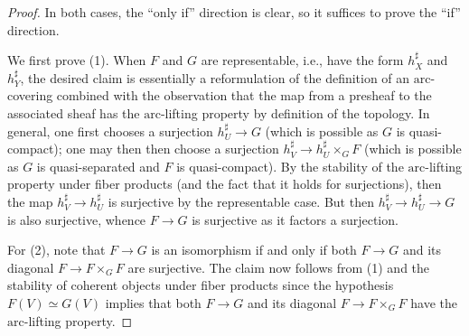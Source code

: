 \documentclass[reqno]{amsart}
\newcommand{\arc}{\mathrm{arc}}
\theoremstyle{definition}
\begin{document}
\begin{proof} In both cases, the ``only if'' direction is clear, so it suffices to prove the ``if'' direction.

We first prove (1). When $F$ and $G$ are representable, i.e., have the form
$h_X^\sharp$ and $h_Y^\sharp$, the desired claim is essentially a reformulation
of the definition of an $\arc$-covering combined with the observation that the
map from a presheaf to the associated sheaf has the $\arc$-lifting property by
definition of the topology. In general, one first chooses a surjection
$h_U^\sharp \to G$ (which is possible as $G$ is quasi-compact); one may then then
choose a surjection $h_V^\sharp \to h_U^\sharp \times_G F$ (which is possible as
$G$ is quasi-separated and $F$ is quasi-compact). By the stability of the
$\arc$-lifting property under fiber products (and the fact that it holds 
for surjections), then the map $h_V^\sharp \to h_U^\sharp$ is surjective by the representable case. But then $h_V^\sharp \to h_U^\sharp \to G$ is also surjective, whence $F \to G$ is surjective as it factors a surjection.

For (2), note that $F \to G$ is an isomorphism if and only if both $F \to G$ and
its diagonal $F \to F \times_G F$ are surjective. The claim now follows from (1)
and the stability of coherent objects under fiber products since the hypothesis $F(V) \simeq G(V)$ implies that both $F \to G$ and its diagonal $F \to F \times_G F$ have the $\arc$-lifting property. \qedhere
\end{proof}
\end{document}
